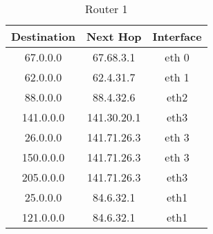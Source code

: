 \documentclass{WeSTassignment}
\begin{document}
\begin{table}[h]
\centering
\caption{Router 1}
\label{Router 1}
\begin{tabular}{ccc}
\hline
\multicolumn{1}{|c|}{\textbf{Destination}} & \multicolumn{1}{c|}{\textbf{Next Hop}} & \multicolumn{1}{c|}{\textbf{Interface}} \\ \hline
67.0.0.0                                   & 67.68.3.1                              & eth 0                                   \\
62.0.0.0                                   & 62.4.31.7                              & eth 1                                   \\
88.0.0.0                                   & 88.4.32.6                              & eth2                                    \\
141.0.0.0                                  & 141.30.20.1                            & eth3                                    \\
26.0.0.0                                   & 141.71.26.3                            & eth 3                                   \\
150.0.0.0                                  & 141.71.26.3                            & eth 3                                   \\
205.0.0.0                                  & 141.71.26.3                            & eth3                                    \\
25.0.0.0                                   & 84.6.32.1                              & eth1                                    \\
121.0.0.0                                  & 84.6.32.1                              & eth1                                   
\end{tabular}
\end{table}
\end{document}
